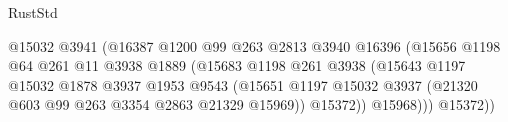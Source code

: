 \begin{lexlean}{RustStd}
\begin{coremodule}
                                                  @15032
                                                  @3941
                                                  (@16387
                                                    @1200
                                                    @99
                                                    @263
                                                    @2813
                                                    @3940
                                                    @16396
                                                    (@15656
                                                      @1198
                                                      @64
                                                      @261
                                                      @11
                                                      @3938
                                                      @1889
                                                      (@15683
                                                        @1198
                                                        @261
                                                        @3938
                                                        (@15643
                                                          @1197
                                                          @15032
                                                          @1878
                                                          @3937
                                                          @1953
                                                          @9543
                                                          (@15651
                                                            @1197
                                                            @15032
                                                            @3937
                                                            (@21320
                                                              @603
                                                              @99
                                                              @263
                                                              @3354
                                                              @2863
                                                              @21329
                                                              @15969))
                                                          @15372))
                                                      @15968)))
                                                @15372))

\end{coremodule}
\end{lexlean}
